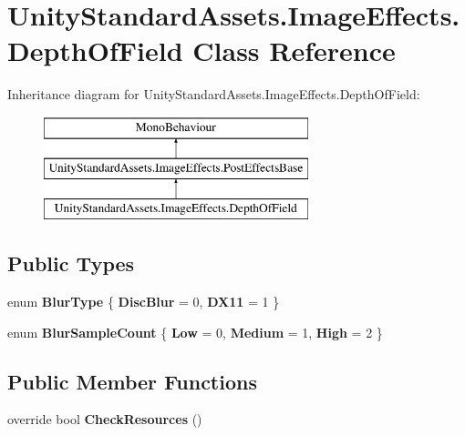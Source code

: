 \hypertarget{class_unity_standard_assets_1_1_image_effects_1_1_depth_of_field}{}\section{Unity\+Standard\+Assets.\+Image\+Effects.\+Depth\+Of\+Field Class Reference}
\label{class_unity_standard_assets_1_1_image_effects_1_1_depth_of_field}
Inheritance diagram for Unity\+Standard\+Assets.\+Image\+Effects.\+Depth\+Of\+Field\+:\begin{figure}[H]
\begin{center}
\leavevmode
\includegraphics[height=3.000000cm]{class_unity_standard_assets_1_1_image_effects_1_1_depth_of_field}
\end{center}
\end{figure}
\subsection*{Public Types}
\begin{DoxyCompactItemize}
\item 
enum {\bfseries Blur\+Type} \{ {\bfseries Disc\+Blur} = 0, 
{\bfseries D\+X11} = 1
 \}\hypertarget{class_unity_standard_assets_1_1_image_effects_1_1_depth_of_field_ab7aaacbb098cf0b20da9d9b6e502d7c7}{}\label{class_unity_standard_assets_1_1_image_effects_1_1_depth_of_field_ab7aaacbb098cf0b20da9d9b6e502d7c7}

\item 
enum {\bfseries Blur\+Sample\+Count} \{ {\bfseries Low} = 0, 
{\bfseries Medium} = 1, 
{\bfseries High} = 2
 \}\hypertarget{class_unity_standard_assets_1_1_image_effects_1_1_depth_of_field_abd4e71b10ed1bbe087a4f15b735bb77b}{}\label{class_unity_standard_assets_1_1_image_effects_1_1_depth_of_field_abd4e71b10ed1bbe087a4f15b735bb77b}

\end{DoxyCompactItemize}
\subsection*{Public Member Functions}
\begin{DoxyCompactItemize}
\item 
override bool {\bfseries Check\+Resources} ()\hypertarget{class_unity_standard_assets_1_1_image_effects_1_1_depth_of_field_a09a1b9c73fd7e06974c88090eff0b951}{}\label{class_unity_standard_assets_1_1_image_effects_1_1_depth_of_field_a09a1b9c73fd7e06974c88090eff0b951}

\end{DoxyCompactItemize}
